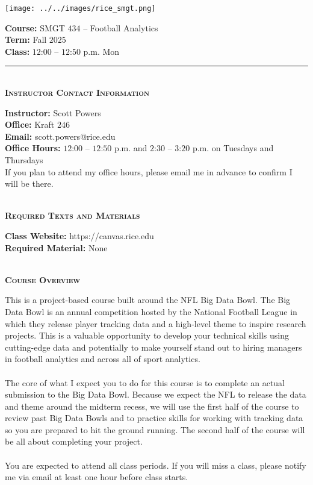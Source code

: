 \documentclass[11pt]{article}
\begin{document}
\begin{minipage}[c]{0.4\linewidth}
  \texttt{[image: ../../images/rice\_smgt.png]}
\end{minipage}
\begin{minipage}[c]{0.6\linewidth}
  \raggedleft
  {\bf Course:} SMGT $434$ -- Football Analytics\\
  {\bf Term:} Fall $2025$\\
  {\bf Class:} $12$:$00$ -- $12$:$50$ p.m. Mon
\end{minipage}

\hrule

~\\
\textbf{\textsc{Instructor Contact Information}}
\begin{adjustwidth}{1cm}{0cm}
	{\bf Instructor:} Scott Powers\\
  {\bf Office:} Kraft $246$\\
  {\bf Email:} scott.powers@rice.edu\\
  {\bf Office Hours:} $12$:$00$ -- $12$:$50$ p.m. and $2$:$30$ -- $3$:$20$ p.m. on Tuesdays and Thursdays\\
  If you plan to attend my office hours, please email me in advance to confirm I will be there.
\end{adjustwidth}

~\\
\textbf{\textsc{Required Texts and Materials}}
\begin{adjustwidth}{1cm}{0cm}
	{\bf Class Website:} https://canvas.rice.edu\\
	{\bf Required Material:} None
\end{adjustwidth}

~\\
\textbf{\textsc{Course Overview}}
\begin{adjustwidth}{1cm}{0cm}
  This is a project-based course built around the NFL Big Data Bowl. The Big Data Bowl is an annual competition hosted by the National Football League in which they release player tracking data and a high-level theme to inspire research projects. This is a valuable opportunity to develop your technical skills using cutting-edge data and potentially to make yourself stand out to hiring managers in football analytics and across all of sport analytics.\\
  ~\\
  The core of what I expect you to do for this course is to complete an actual submission to the Big Data Bowl. Because we expect the NFL to release the data and theme around the midterm recess, we will use the first half of the course to review past Big Data Bowls and to practice skills for working with tracking data so you are prepared to hit the ground running. The second half of the course will be all about completing your project.\\
  ~\\
  You are expected to attend all class periods. If you will miss a class, please notify me via email at least one hour before class starts.
\end{adjustwidth}
\end{document}
